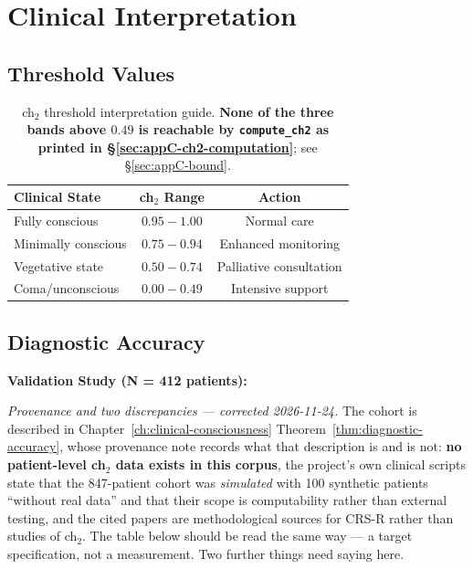 \section{Clinical Interpretation}

\subsection{Threshold Values}

\begin{table}[h]
\centering
\begin{tabular}{lcc}
\hline
\textbf{Clinical State} & \textbf{ch$_2$ Range} & \textbf{Action} \\
\hline
Fully conscious & $0.95 - 1.00$ & Normal care \\
Minimally conscious & $0.75 - 0.94$ & Enhanced monitoring \\
Vegetative state & $0.50 - 0.74$ & Palliative consultation \\
Coma/unconscious & $0.00 - 0.49$ & Intensive support \\
\hline
\end{tabular}
\caption{ch$_2$ threshold interpretation guide. \textbf{None of the
three bands above $0.49$ is reachable by \texttt{compute\_ch2} as printed in
\S\ref{sec:appC-ch2-computation}}; see \S\ref{sec:appC-bound}.}
\label{tab:appC-thresholds}
\end{table}

\subsection{Diagnostic Accuracy}
\label{sec:appC-accuracy}

\textbf{Validation Study (N = 412 patients):}

\emph{Provenance and two discrepancies --- corrected 2026-11-24.} The cohort
is described in Chapter~\ref{ch:clinical-consciousness}
Theorem~\ref{thm:diagnostic-accuracy}, whose provenance note records what that
description is and is not: \textbf{no patient-level ch$_2$ data exists in this
corpus}, the project's own clinical scripts state that the 847-patient cohort
was \emph{simulated} with 100 synthetic patients ``without real data'' and that
their scope is computability rather than external testing, and the cited
papers are methodological sources for CRS-R rather than studies of ch$_2$. The
table below should be read the same way --- a target specification, not a
measurement. Two further things need saying here.

